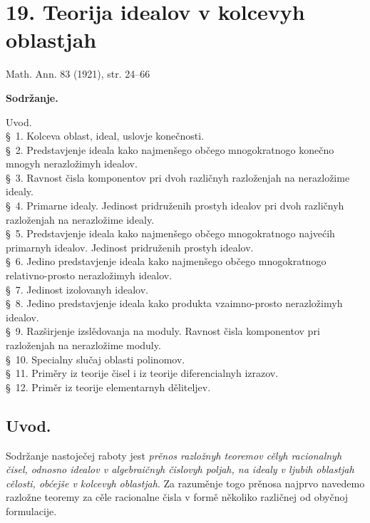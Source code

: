\documentclass[11pt]{article}
\begin{document}

\setcounter{footnote}{0}
\section*{19. Teorija idealov v kolcevyh oblastjah}
\begin{center}
Math. Ann. 83 (1921), str. 24--66
\end{center}

\begin{center}\textbf{Sodržanje.}\end{center}
\noindent Uvod.\\
\S~1. Kolceva oblast, ideal, uslovje konečnosti.\\
\S~2. Predstavjenje ideala kako najmenšego občego mnogokratnogo konečno mnogyh nerazložimyh idealov.\\
\S~3. Ravnost čisla komponentov pri dvoh različnyh razloženjah na nerazložime idealy.\\
\S~4. Primarne idealy. Jedinost pridruženih prostyh idealov pri dvoh različnyh razloženjah na nerazložime idealy.\\
\S~5. Predstavjenje ideala kako najmenšego občego mnogokratnogo najvećih primarnyh idealov. Jedinost pridruženih prostyh idealov.\\
\S~6. Jedino predstavjenje ideala kako najmenšego občego mnogokratnogo relativno-prosto nerazložimyh idealov.\\
\S~7. Jedinost izolovanyh idealov.\\
\S~8. Jedino predstavjenje ideala kako produkta vzaimno-prosto nerazložimyh idealov.\\
\S~9. Razširjenje izslědovanja na moduly. Ravnost čisla komponentov pri razloženjah na nerazložime moduly.\\
\S~10. Specialny slučaj oblasti polinomov.\\
\S~11. Priměry iz teorije čisel i iz teorije diferencialnyh izrazov.\\
\S~12. Priměr iz teorije elementarnyh děliteljev.

\subsection*{Uvod.}
Sodržanje nastoječej raboty jest \emph{prěnos razložnyh teoremov cělyh racionalnyh čisel, odnosno idealov v algebraičnyh čislovyh poljah, na idealy v ljubih oblastjah cělosti, obćejše v kolcevyh oblastjah}. Za razuměnje togo prěnosa najprvo navedemo razložne teoremy za cěle racionalne čisla v formě několiko različnej od obyčnoj formulacije.
\end{document}
